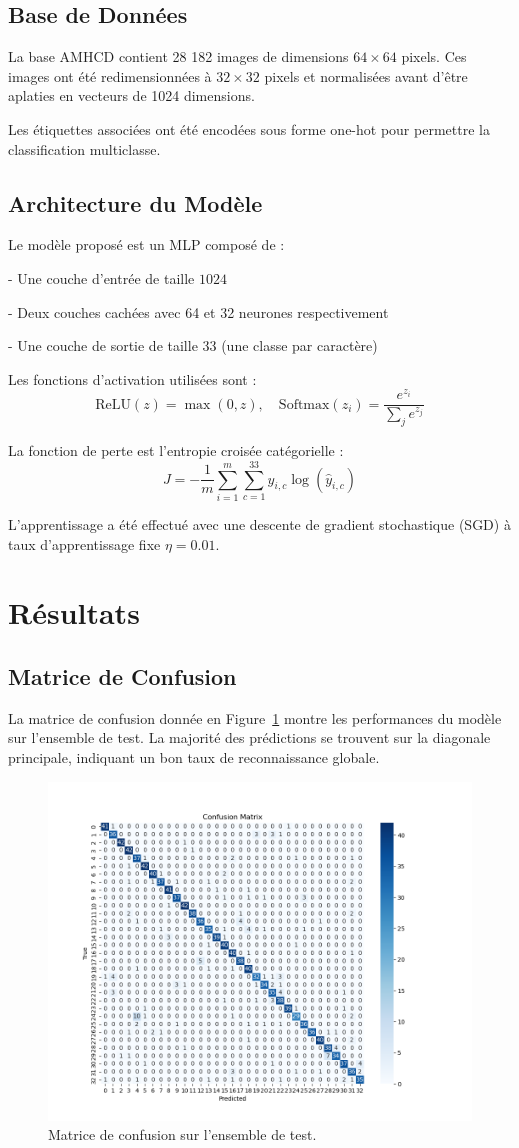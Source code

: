 \documentclass[12pt,a4paper]{article}
\begin{document}
	\subsection{Base de Données}
	La base AMHCD contient 28 182 images de dimensions $64 \times 64$ pixels. Ces images ont été redimensionnées à $32 \times 32$ pixels et normalisées avant d'être aplaties en vecteurs de 1024 dimensions.
	
	Les étiquettes associées ont été encodées sous forme one-hot pour permettre la classification multiclasse.
	
	\subsection{Architecture du Modèle}
	Le modèle proposé est un MLP composé de :
	
	
	- Une couche d’entrée de taille $1024$
	
	- Deux couches cachées avec 64 et 32 neurones respectivement
	
	- Une couche de sortie de taille $33$ (une classe par caractère)
	
	
	Les fonctions d’activation utilisées sont :
	\[
	\text{ReLU}(z) = \max(0, z), \quad \text{Softmax}(z_i) = \frac{e^{z_i}}{\sum_{j} e^{z_j}}
	\]
	
	La fonction de perte est l’entropie croisée catégorielle :
	\[
	J = -\frac{1}{m} \sum_{i=1}^m \sum_{c=1}^{33} y_{i,c} \log(\hat{y}_{i,c})
	\]
	
	L’apprentissage a été effectué avec une descente de gradient stochastique (SGD) à taux d'apprentissage fixe $\eta = 0.01$.
	
	\section{Résultats}
	\subsection{Matrice de Confusion}
	La matrice de confusion donnée en Figure~\ref{fig:confusion} montre les performances du modèle sur l'ensemble de test. La majorité des prédictions se trouvent sur la diagonale principale, indiquant un bon taux de reconnaissance globale.
	
	\begin{figure}[h]
		\centering
		\includegraphics[width=0.7\linewidth]{confusion_matrix.png}
		\caption{Matrice de confusion sur l'ensemble de test.}
		\label{fig:confusion}
	\end{figure}
	
\end{document}
